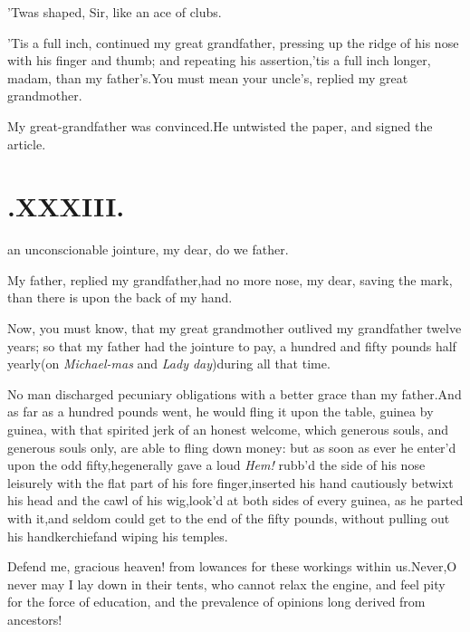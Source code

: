 \documentclass{article}
\begin{document}
\tsh ’Twas shaped, Sir, like an ace of clubs.

\tsh ’Tis a full inch, continued my great grandfather,
pressing up the ridge of his nose with his finger and thumb; and
repeating his assertion,\tsh ’tis a full inch longer,
madam, than my father’s\tsh.\break You must mean your
uncle’s, replied my great grandmother.

\tsh My great-grandfather was convinced.\tsk He
untwisted the paper, and signed the article.

\null
\section{.\quad  XXXIII.}

 an unconscionable\break
jointure, my dear, do we
father.

My father, replied my grandfather,\break had no more nose, my dear,
saving the mark, than there is upon the back of my\break
hand.\tsh

\tsk Now, you must know, that my great grandmother outlived my
grandfather twelve years; so that my father
had the
jointure to pay, a hundred and fifty pounds half yearly\tsk (on
\textit{Michael-\break mas} and \textit{Lady day})\tsk during all
that\break
time.

No man discharged pecuniary obligations with a better grace than
my father.\tsh And as far as a hundred pounds went, he
would fling it upon the table, guinea by guinea, with that spirited
jerk of an honest welcome, which generous souls, and generous souls
only, are able to fling down money: but as soon as ever he
enter’d upon the odd fifty,\tsk he\break generally gave a loud
\textit{Hem!} rubb’d the side of his nose leisurely with the
flat part of his fore finger,\tsh inserted his hand
cautiously betwixt his head and the cawl of his
wig,\tsk look’d at both sides of every guinea, as he parted
with it,\tsk and seldom could get to the end of the fifty
pounds, without pulling out his handkerchief\break and wiping his
temples.

Defend me, gracious heaven! from 
lowances for these workings within us.\tsk Never,\tsk O never may I lay down in their
tents, who cannot relax the engine, and feel pity for the force of
education, and the prevalence of opinions long derived from
ancestors!
\end{document}

